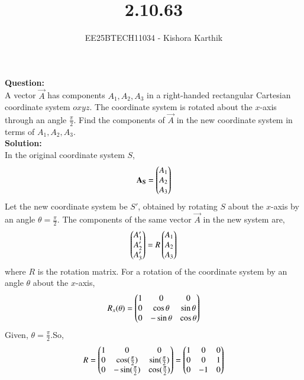 \documentclass[journal]{IEEEtran}
\begin{document}

\vspace{3cm}

\title{2.10.63}
\author{EE25BTECH11034 - Kishora Karthik}
{\let\newpage\relax\maketitle}

\renewcommand{\thefigure}{\theenumi}
\renewcommand{\thetable}{\theenumi}
\textbf{Question:}\\
A vector $\vec{A}$ has components $A_1, A_2, A_3$ in a right-handed rectangular Cartesian coordinate system $oxyz$. The coordinate system is rotated about the $x$-axis through an angle $\frac{\pi}{2}$. Find the components of $\vec{A}$ in the new coordinate system in terms of $A_1, A_2, A_3$.\\
\textbf{Solution:}\\
In the original coordinate system $S$,
\begin{align}
    \mathbf{A_S} = \begin{pmatrix} A_1 \\ A_2 \\ A_3\end{pmatrix}  
\end{align}
Let the new coordinate system be $S'$, obtained by rotating $S$ about the $x$-axis by an angle $\theta = \frac{\pi}{2}$. The components of the same vector $\vec{A}$ in the new system are,
\begin{align}
    \begin{pmatrix}A'_1 \\ A'_2 \\ A'_3\end{pmatrix}   = R \begin{pmatrix}A_1 \\ A_2 \\ A_3\end{pmatrix} 
\end{align}
where $R$ is the rotation matrix.
For a rotation of the coordinate system by an angle $\theta$ about the $x$-axis, 
\begin{align}
    R_x(\theta) = \begin{pmatrix}1 & 0 & 0 \\ 0 & \cos\theta & \sin\theta \\ 0 & -\sin\theta & \cos\theta\end{pmatrix}  
\end{align}
Given, $\theta = \frac{\pi}{2}$.So,
\begin{align}    
R = \begin{pmatrix} 1 & 0 & 0 \\ 0 & \cos(\frac{\pi}{2}) & \sin(\frac{\pi}{2}) \\ 0 & -\sin(\frac{\pi}{2}) & \cos(\frac{\pi}{2})\end{pmatrix}   = \begin{pmatrix} 1 & 0 & 0 \\ 0 & 0 & 1 \\ 0 & -1 & 0\end{pmatrix}  
\end{align}
\end{document}
